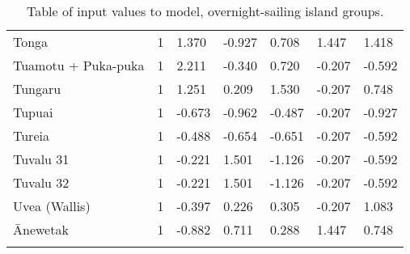 \begin{longtable}{p{4.5cm}p{1.4cm}p{1.4cm}p{1.7cm}p{1.7cm}p{1.7cm}p{1.7cm}}
  Tonga & 1 & 1.370 & -0.927 & 0.708 & 1.447 & 1.418 \\ 
  Tuamotu + Puka-puka & 1 & 2.211 & -0.340 & 0.720 & -0.207 & -0.592 \\ 
  Tungaru & 1 & 1.251 & 0.209 & 1.530 & -0.207 & 0.748 \\ 
  Tupuai & 1 & -0.673 & -0.962 & -0.487 & -0.207 & -0.927 \\ 
  Tureia & 1 & -0.488 & -0.654 & -0.651 & -0.207 & -0.592 \\ 
  Tuvalu 31 & 1 & -0.221 & 1.501 & -1.126 & -0.207 & -0.592 \\ 
  Tuvalu 32 & 1 & -0.221 & 1.501 & -1.126 & -0.207 & -0.592 \\ 
  Uvea (Wallis) & 1 & -0.397 & 0.226 & 0.305 & -0.207 & 1.083 \\ 
  Ānewetak & 1 & -0.882 & 0.711 & 0.288 & 1.447 & 0.748 \\ 
   \bottomrule
\caption{Table of input values to model, overnight-sailing island groups.} 
\label{appendix_SBZR_table}
\end{longtable}
